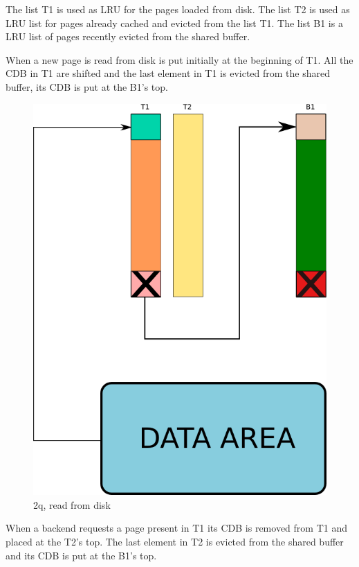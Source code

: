 The list T1 is used as LRU for the pages loaded from disk. The list T2 is used as LRU list for pages already cached 
and evicted from the list T1. The list B1 is a LRU list of pages recently evicted from the shared buffer.

When a new page is read from disk is put initially at the beginning of T1. All the CDB in T1 are shifted and the 
last element in T1 is evicted from the shared buffer, its CDB is put at the B1's top.\newline 

\begin{figure}[H]
\includegraphics[scale=0.4]{images/2q_01.png}

\caption{2q, read from disk}

\end{figure}

When a backend requests a page present in T1 its CDB is removed from T1 and placed at the T2's top. The last 
element in T2 is  evicted from the shared buffer and its CDB is put at the B1's top.\newline

